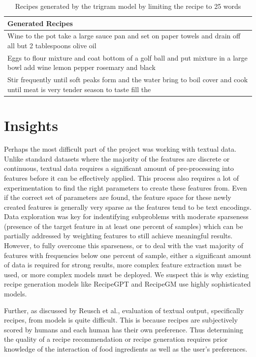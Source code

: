 \documentclass[sigconf]{acmart}
\begin{document}
\begin{table}[]
    \centering
    \begin{tabular}{|p{8cm}|}
        \hline Generated Recipes \\
        \hline\hline Wine to the pot take a large sauce pan and set on paper towels  and drain off all but 2 tablespoons olive oil\\
        \hline Eggs to flour mixture and coat bottom of a golf ball and put mixture in a large bowl add wine lemon pepper rosemary and black\\
        \hline Stir frequently until soft peaks form and the water bring to boil cover and cook until meat is very tender season to taste fill the\\
        \hline
    \end{tabular}
    \caption{Recipes generated by the trigram model by limiting the recipe to 25 words}
    \label{tab:recipe_generation_samples}
\end{table}


\section{Insights}
Perhaps the most difficult part of the project was working with textual data. Unlike standard datasets where the majority of the features are discrete or continuous, textual data requires a significant amount of pre-processing into features before it can be effectively applied. This process also requires a lot of experimentation to find the right parameters to create these features from. Even if the correct set of parameters are found, the feature space for these newly created features is generally very sparse as the features tend to be text encodings. Data exploration was key for indentifying subproblems with moderate sparseness (presence of the target feature in at least one percent of samples) which can be partially addressed by weighting features to still achieve meaningful results. However, to fully overcome this sparseness, or to deal with the vast majority of features with frequencies below one percent of sample, either a significant amount of data is required for strong results, more complex feature extraction must be used, or more complex models must be deployed. We suspect this is why existing recipe generation models like RecipeGPT\cite{NLPRecipeGPT} and RecipeGM\cite{NLPRecipeGM} use highly sophisticated models.

Further, as discussed by Reusch et al.\cite{NLPRecipeGM}, evaluation of textual output, specifically recipes, from models is quite difficult. This is because recipes are subjectively scored by humans and each human has their own preference. Thus determining the quality of a recipe recommendation or recipe generation requires prior knowledge of the interaction of food ingredients as well as the user's preferences.
\end{document}
